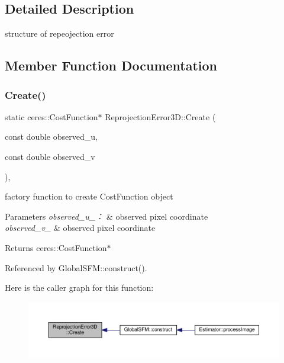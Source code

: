 \subsection{Detailed Description}
structure of repeojection error 

\subsection{Member Function Documentation}
\mbox{\label{structReprojectionError3D_adb37d081c013ea177b2fb3a26d9e7aab}} 
\subsubsection{\texorpdfstring{Create()}{Create()}}
{\footnotesize\ttfamily static ceres\+::\+Cost\+Function$\ast$ Reprojection\+Error3\+D\+::\+Create (\begin{DoxyParamCaption}\item[{const double}]{observed\+\_\+u,  }\item[{const double}]{observed\+\_\+v }\end{DoxyParamCaption})\hspace{0.3cm}{\ttfamily [inline]}, {\ttfamily [static]}}



factory function to create Cost\+Function object 


\begin{DoxyParams}{Parameters}
{\em observed\+\_\+u\+\_\+：} & observed pixel coordinate \\
\hline
{\em observed\+\_\+v\+\_\+} & observed pixel coordinate \\
\hline
\end{DoxyParams}
\begin{DoxyReturn}{Returns}
ceres\+::\+Cost\+Function$\ast$ 
\end{DoxyReturn}


Referenced by Global\+S\+F\+M\+::construct().

Here is the caller graph for this function\+:
\nopagebreak
\begin{figure}[H]
\begin{center}
\leavevmode
\includegraphics[width=350pt]{structReprojectionError3D_adb37d081c013ea177b2fb3a26d9e7aab_icgraph}
\end{center}
\end{figure}
\mbox{\label{structReprojectionError3D_a7cbde2912c71ddefcf084788ce649e9a}} 
